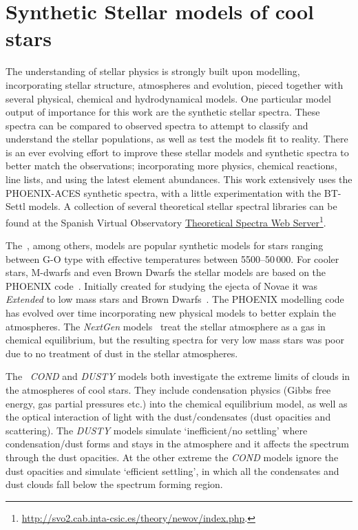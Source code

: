 

\section{Synthetic Stellar models of cool stars}
The understanding of stellar physics is strongly built upon modelling, incorporating stellar structure, atmospheres and evolution, pieced together with several physical, chemical and hydrodynamical models.
One particular model output of importance for this work are the synthetic stellar spectra.
These spectra can be compared to observed spectra to attempt to classify and understand the stellar populations, as well as test the models fit to reality.
There is an ever evolving effort to improve these stellar models and synthetic spectra to better match the observations; incorporating more physics, chemical reactions, line lists, and using the latest element abundances.
This work extensively uses the {PHOENIX-ACES} synthetic spectra, with a little experimentation with the {BT-Settl} models.
A collection of several theoretical stellar spectral libraries can be found at the Spanish Virtual Observatory \href{http://svo2.cab.inta-csic.es/theory/newov/index.php}{Theoretical Spectra Web Server}\footnote{\href{http://svo2.cab.inta-csic.es/theory/newov/index.php}{\url{http://svo2.cab.inta-csic.es/theory/newov/index.php}}.}.

The~\citet{kurucz_model_1979}, among others, models are popular synthetic models for stars ranging between G-O type with effective temperatures between 5500--50\,000\K{}.
For cooler stars, M-dwarfs and even Brown Dwarfs the stellar models are based on the {PHOENIX} code~\citep[e.g.][]{hauschildt_parallel_1997}.
Initially created for studying the ejecta of Novae it was \emph{Extended} to low mass stars and Brown Dwarfs~\citep{allard_model_1995}.
The {PHOENIX} modelling code has evolved over time incorporating new physical models to better explain the atmospheres.
The \emph{NextGen} models~\citep{hauschildt_nextgen_1999} treat the stellar atmosphere as a gas in chemical equilibrium, but the resulting spectra for very low mass stars was poor due to no treatment of dust in the stellar atmospheres.

The~\citet{allard_limiting_2001} \emph{COND} and \emph{DUSTY} models both investigate the extreme limits of clouds in the atmospheres of cool stars.
They include condensation physics (Gibbs free energy, gas partial pressures etc.) into the chemical equilibrium model, as well as the optical interaction of light with the dust/condensates (dust opacities and scattering).
The \emph{DUSTY} models simulate `inefficient/no settling' where condensation/dust forms and stays in the atmosphere and it affects the spectrum through the dust opacities.
At the other extreme the \emph{COND} models ignore the dust opacities and simulate `efficient settling', in which all the condensates and dust clouds fall below the spectrum forming region.


